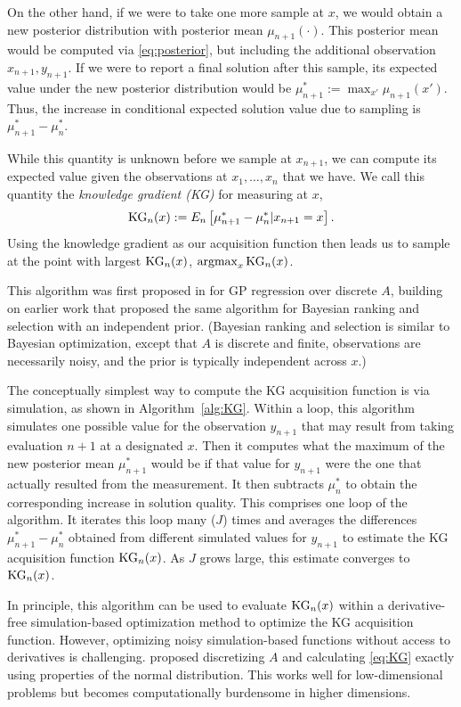 \documentclass{article}
\begin{document}
On the other hand, if we were to take one more sample at $x$, we would obtain a new posterior distribution with posterior mean $\mu_{n+1}(\cdot)$.  This posterior mean would be computed via \eqref{eq:posterior}, but including the additional observation $x_{n+1},y_{n+1}$.  If we were to report a final solution after this sample, its expected value under the new posterior distribution would be $\mu^*_{n+1} := \max_{x'} \mu_{n+1}(x')$.
Thus, the increase in conditional expected solution value due to sampling is $\mu^*_{n+1} - \mu^*_n$.

While this quantity is unknown before we sample at $x_{n+1}$, we can compute its expected value given the observations at $x_1,\ldots,x_n$ that we have.  We call this quantity the {\it knowledge gradient (KG)} for measuring at $x$,
\begin{equation}
\mathrm{KG}_n(x) := E_n\left[ \mu^*_{n+1} - \mu^*_n | x_{n+1} = x\right].
\label{eq:KG}
\end{equation}
Using the knowledge gradient as our acquisition function then leads us to sample at the point with largest $\mathrm{KG}_n(x)$, $\mathop{\mathrm{argmax}}_x \mathrm{KG}_n(x)$.

This algorithm was first proposed in \cite{frazier2009knowledge} for GP regression over discrete $A$, building on earlier work \citep{frazier2008knowledge} that proposed the same algorithm for Bayesian ranking and selection \citep{chick2001new} with an independent prior.  (Bayesian ranking and selection is similar to Bayesian optimization, except that $A$ is discrete and finite, observations are necessarily noisy, and the prior is typically independent across $x$.)
 

The conceptually simplest way to compute the KG acquisition function is via simulation, as shown in Algorithm~\ref{alg:KG}.  Within a loop, this algorithm simulates one possible value for the observation $y_{n+1}$ that may result from taking evaluation $n+1$ at a designated $x$.  Then it computes what the maximum of the new posterior mean $\mu^*_{n+1}$ would be if that value for $y_{n+1}$ were the one that actually resulted from the measurement.  It then subtracts $\mu^*_n$ to obtain the corresponding increase in solution quality.
This comprises one loop of the algorithm.
It iterates this loop many ($J$) times and averages the differences $\mu^*_{n+1} - \mu^*_n$ obtained from different simulated values for $y_{n+1}$ to estimate the KG acquisition function $\mathrm{KG}_n(x)$.   
As $J$ grows large, this estimate converges to $\mathrm{KG}_n(x)$.

In principle, this algorithm can be used to evaluate $\mathrm{KG}_n(x)$ within a derivative-free simulation-based optimization method to optimize the KG acquisition function.  However, optimizing noisy simulation-based functions without access to derivatives is challenging.  \cite{frazier2009knowledge} proposed discretizing $A$ and calculating \eqref{eq:KG} exactly using properties of the normal distribution.  This works well for low-dimensional problems but becomes computationally burdensome in higher dimensions.  
\end{document}
